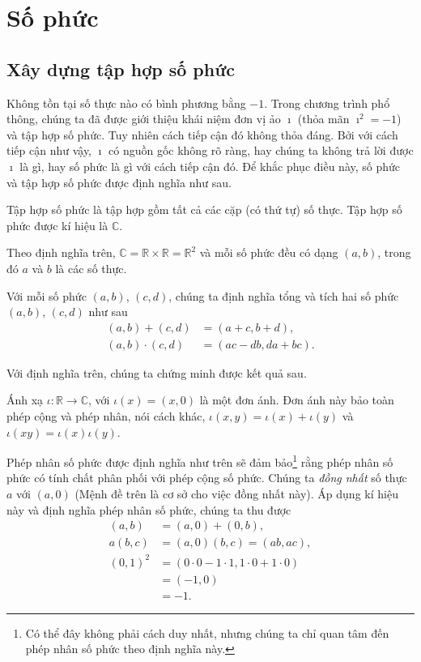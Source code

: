 \section{Số phức}

\subsection{Xây dựng tập hợp số phức}

Không tồn tại số thực nào có bình phương bằng $-1$. Trong chương trình phổ thông, chúng ta đã được giới thiệu khái niệm đơn vị ảo $\imath$ (thỏa mãn $\imath^{2} = -1$) và tập hợp số phức. Tuy nhiên cách tiếp cận đó không thỏa đáng. Bởi với cách tiếp cận như vậy, $\imath$ có nguồn gốc không rõ ràng, hay chúng ta không trả lời được $\imath$ là gì, hay số phức là gì với cách tiếp cận đó. Để khắc phục điều này, số phức và tập hợp số phức được định nghĩa như sau.
\begin{definition}
	Tập hợp số phức là tập hợp gồm tất cả các cặp (có thứ tự) số thực. Tập hợp số phức được kí hiệu là $\mathbb{C}$.
\end{definition}

Theo định nghĩa trên, $\mathbb{C} = \mathbb{R}\times\mathbb{R} = \mathbb{R}^{2}$ và mỗi số phức đều có dạng $(a, b)$, trong đó $a$ và $b$ là các số thực.

\begin{definition}
	Với mỗi số phức $(a, b)$, $(c, d)$, chúng ta định nghĩa tổng và tích hai số phức $(a, b)$, $(c, d)$ như sau
	\begin{align*}
		(a, b) + (c, d)    & = (a + c, b + d),     \\
		(a, b)\cdot (c, d) & = (ac - db, da + bc).
	\end{align*}
\end{definition}

Với định nghĩa trên, chúng ta chứng minh được kết quả sau.
\begin{proposition}
	Ánh xạ $\iota: \mathbb{R}\to \mathbb{C}$, với $\iota(x) = (x, 0)$ là một đơn ánh. Đơn ánh này bảo toàn phép cộng và phép nhân, nói cách khác, $\iota(x, y) = \iota(x) + \iota(y)$ và $\iota(xy) = \iota(x)\iota(y)$.
\end{proposition}

Phép nhân số phức được định nghĩa như trên sẽ đảm bảo\footnote{Có thể đây không phải cách duy nhất, nhưng chúng ta chỉ quan tâm đến phép nhân số phức theo định nghĩa này.} rằng phép nhân số phức có tính chất phân phối với phép cộng số phức. Chúng ta \textit{đồng nhất} số thực $a$ với $(a, 0)$ (Mệnh đề trên là cơ sở cho việc đồng nhất này). Áp dụng kí hiệu này và định nghĩa phép nhân số phức, chúng ta thu được
\[
	\begin{split}
		(a, b) & = (a, 0) + (0, b), \\
		a(b, c) & = (a, 0)(b, c) = (ab, ac), \\
		{(0, 1)}^{2} & = (0\cdot 0 - 1\cdot 1, 1\cdot 0 + 1\cdot 0) \\
		& = (-1, 0) \\
		& = -1.
	\end{split}
\]

